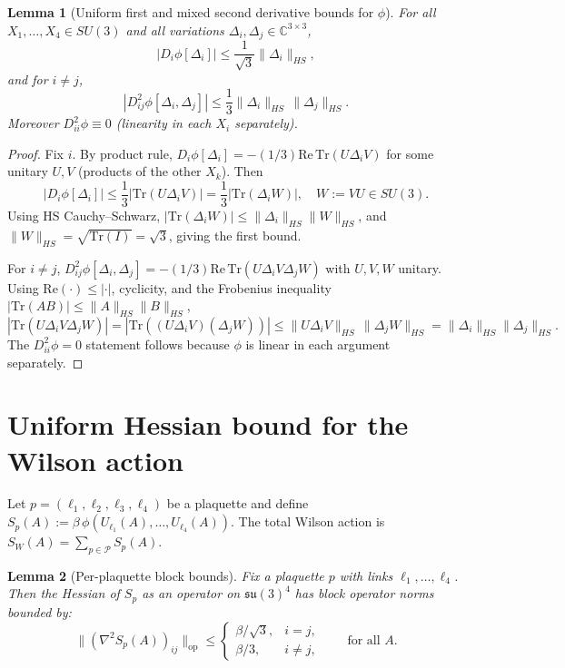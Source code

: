 \documentclass[11pt]{article}
\newtheorem{lemma}{Lemma}
\begin{document}
\begin{lemma}[Uniform first and mixed second derivative bounds for $\phi$]
\label{lem:trace-derivatives}
For all $X_1,\dots,X_4\in SU(3)$ and all variations $\Delta_i,\Delta_j\in\mathbb{C}^{3\times 3}$,
\[
|D_i\phi[\Delta_i]|\le \frac{1}{\sqrt{3}}\|\Delta_i\|_{HS},
\]
and for $i\neq j$,
\[
|D^2_{ij}\phi[\Delta_i,\Delta_j]|\le \frac{1}{3}\|\Delta_i\|_{HS}\,\|\Delta_j\|_{HS}.
\]
Moreover $D^2_{ii}\phi\equiv 0$ (linearity in each $X_i$ separately).
\end{lemma}

\begin{proof}
Fix $i$. By product rule,
$D_i\phi[\Delta_i]=-(1/3)\mathrm{Re\,Tr}(U\Delta_i V)$ for some unitary $U,V$ (products of the other $X_k$). Then
\[
|D_i\phi[\Delta_i]|
\le \frac{1}{3}|\mathrm{Tr}(U\Delta_i V)|
= \frac{1}{3}|\mathrm{Tr}(\Delta_i W)|,\quad W:=VU\in SU(3).
\]
Using HS Cauchy--Schwarz, $|\mathrm{Tr}(\Delta_i W)|\le \|\Delta_i\|_{HS}\|W\|_{HS}$, and $\|W\|_{HS}=\sqrt{\mathrm{Tr}(I)}=\sqrt{3}$, giving the first bound.

For $i\neq j$, $D^2_{ij}\phi[\Delta_i,\Delta_j]=-(1/3)\mathrm{Re\,Tr}(U\Delta_i V\Delta_j W)$ with $U,V,W$ unitary. Using $\mathrm{Re}(\cdot)\le|\cdot|$, cyclicity, and the Frobenius inequality $|\mathrm{Tr}(AB)|\le \|A\|_{HS}\|B\|_{HS}$,
\[
|\mathrm{Tr}(U\Delta_i V\Delta_j W)|
=|\mathrm{Tr}((U\Delta_i V)(\Delta_j W))|
\le \|U\Delta_i V\|_{HS}\,\|\Delta_j W\|_{HS}
=\|\Delta_i\|_{HS}\|\Delta_j\|_{HS}.
\]
The $D^2_{ii}\phi=0$ statement follows because $\phi$ is linear in each argument separately.
\end{proof}

\section{Uniform Hessian bound for the Wilson action}

Let $p=(\ell_1,\ell_2,\ell_3,\ell_4)$ be a plaquette and define $S_p(A):=\beta\,\phi(U_{\ell_1}(A),\dots,U_{\ell_4}(A))$.
The total Wilson action is $S_W(A)=\sum_{p\in\mathcal{P}}S_p(A)$.

\begin{lemma}[Per-plaquette block bounds]
\label{lem:plaquette-blocks}
Fix a plaquette $p$ with links $\ell_1,\dots,\ell_4$.
Then the Hessian of $S_p$ as an operator on $\mathfrak{su}(3)^4$ has block operator norms bounded by:
\[
\|(\nabla^2 S_p(A))_{ij}\|_{\mathrm{op}}
\le
\begin{cases}
\beta/\sqrt{3}, & i=j,\\[3pt]
\beta/3, & i\neq j,
\end{cases}
\qquad\text{for all }A.
\]
\end{lemma}
\end{document}

